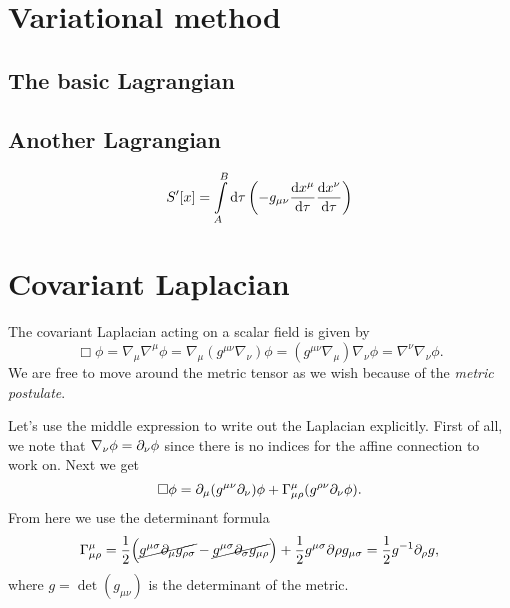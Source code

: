 \documentclass[11pt,a4paper, 
swedish, english %
]{article}
\begin{document}
\section{Variational method}

\subsection{The basic Lagrangian}

\subsection{Another Lagrangian}
\begin{equation}\label{eq5:Lagrangian2}
S'[x]=\int_A^B\rd\tau\,\qty(-g_{\mu\nu}\dv{x^\mu}{\tau}\dv{x^\nu}{\tau})
\end{equation}



\section{Covariant Laplacian}
\swapcommands{\phi}{\varphi}
The covariant Laplacian acting on a scalar field is given by
\begin{equation}
\Box\phi=\nabla_\mu\nabla^\mu\phi=\nabla_\mu(g^{\mu\nu}\nabla_\nu)\phi
=(g^{\mu\nu}\nabla_\mu)\nabla_\nu\phi
=\nabla^\nu\nabla_\nu\phi.
\end{equation}
We are free to move around the metric tensor as we wish because of the
\emph{metric postulate}.

Let's use the middle expression to write out the Laplacian
explicitly. First of all, we note that $\nabla_\nu\phi=\partial_\nu\phi$
since there is no indices for the affine connection to work on. Next
we get
\begin{equation}
\Box\phi=\partial_\mu(g^{\mu\nu}\partial_\nu)\phi
+\Gamma^\mu_{\mu\rho}(g^{\rho\nu}\partial_{\nu}\phi).
\end{equation}
From here we use the determinant formula
\begin{equation}
\Gamma^\mu_{\mu\rho}=\frac{1}{2}
\Big(\cancel{g^{\mu\sigma}\partial_\mu g_{\rho\sigma}}
-\cancel{g^{\mu\sigma}\partial_\sigma g_{\mu\rho}} \Big)
+\frac{1}{2}g^{\mu\sigma}\partial\rho g_{\mu\sigma}
=\frac{1}{2}g^{-1}\partial_\rho g,
\end{equation}
where $g=\det(g_{\mu\nu})$ is the determinant of the metric.
\end{document}
